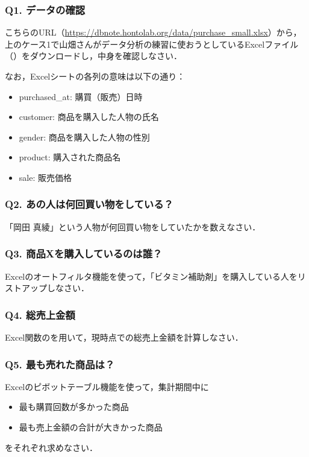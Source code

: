 \subsubsection{Q1. データの確認}
こちらのURL（\url{https://dbnote.hontolab.org/data/purchase\_small.xlsx}）から，上のケース1で山畑さんがデータ分析の練習に使おうとしているExcelファイル（）をダウンロードし，中身を確認しなさい．

なお，Excelシートの各列の意味は以下の通り：
\begin{itemize}
\item purchased\_at: 購買（販売）日時
\item customer: 商品を購入した人物の氏名
\item gender: 商品を購入した人物の性別
\item product: 購入された商品名
\item sale: 販売価格
\end{itemize}


\subsubsection{Q2. あの人は何回買い物をしている？}
「岡田 真綾」という人物が何回買い物をしていたかを数えなさい．


\subsubsection{Q3. 商品Xを購入しているのは誰？}
Excelのオートフィルタ機能を使って，「ビタミン補助剤」を購入している人をリストアップしなさい．


\subsubsection{Q4. 総売上金額}
Excel関数のを用いて，現時点での総売上金額を計算しなさい．


\subsubsection{Q5. 最も売れた商品は？}
Excelのピボットテーブル機能を使って，集計期間中に
\begin{itemize}
\item 最も購買回数が多かった商品
\item 最も売上金額の合計が大きかった商品
\end{itemize}
をそれぞれ求めなさい．



